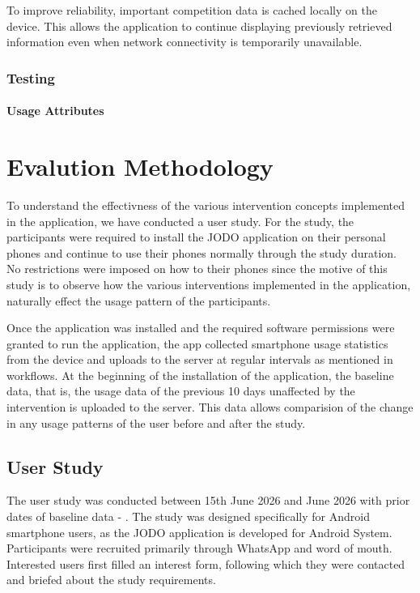 \documentclass[11pt]{report}
\begin{document}
To improve reliability, important competition data is cached locally on the device. 
This allows the application to continue displaying previously retrieved information 
even when network connectivity is temporarily unavailable.

\subsection{Testing}

\subsubsection{Usage Attributes}


\newpage
\chapter{Evalution Methodology}

To understand the effectivness of the various intervention concepts implemented in the application, we have conducted a user study. 
For the study, the participants were required to install the JODO application on their personal phones and continue to use their phones normally through the study duration.
No restrictions were imposed on how to their phones since the motive of this study is to observe how the various interventions implemented in the application, naturally effect the usage pattern of the participants.

Once the application was installed and the required software permissions were granted to run the application, the app collected smartphone usage statistics from the device and uploads to the server at regular intervals as mentioned in workflows.
At the beginning of the installation of the application, the baseline data, that is, the usage data of the previous 10 days unaffected by the intervention is uploaded to the server. This data allows comparision of the change in any usage patterns of the user before and after the study.

\section{User Study}
The user study was conducted between 15th June 2026 and  June 2026 with prior dates of baseline data - . 
The study was designed specifically for Android smartphone users, as the JODO application is developed for Android System. 
Participants were recruited primarily through WhatsApp and word of mouth. 
Interested users first filled an interest form, following which they were contacted and briefed about the study requirements.
\end{document}
